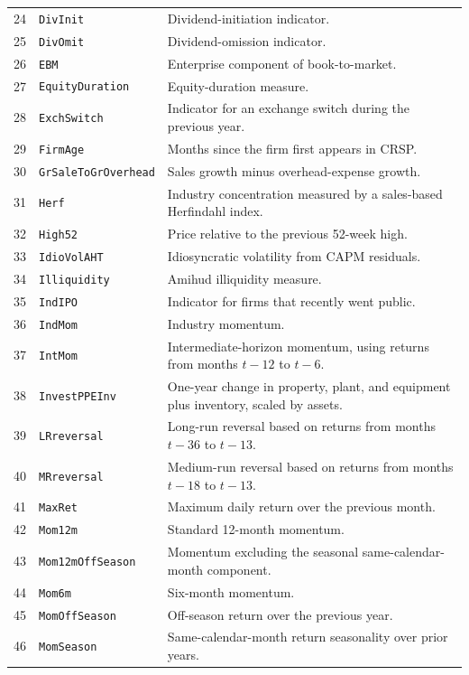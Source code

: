 \documentclass[11pt,letterpaper]{article}
\begin{document}
{\begin{longtable}{@{} r p{} p{} @{}}
  24 & \texttt{DivInit} & Dividend-initiation indicator. \\
  25 & \texttt{DivOmit} & Dividend-omission indicator. \\
  26 & \texttt{EBM} & Enterprise component of book-to-market. \\
  27 & \texttt{EquityDuration} & Equity-duration measure. \\
  28 & \texttt{ExchSwitch} & Indicator for an exchange switch during the previous year. \\
  29 & \texttt{FirmAge} & Months since the firm first appears in CRSP. \\
  30 & \texttt{GrSaleToGrOverhead} & Sales growth minus overhead-expense growth. \\
  31 & \texttt{Herf} & Industry concentration measured by a sales-based Herfindahl index. \\
  32 & \texttt{High52} & Price relative to the previous 52-week high. \\
  33 & \texttt{IdioVolAHT} & Idiosyncratic volatility from CAPM residuals. \\
  34 & \texttt{Illiquidity} & Amihud illiquidity measure. \\
  35 & \texttt{IndIPO} & Indicator for firms that recently went public. \\
  36 & \texttt{IndMom} & Industry momentum. \\
  37 & \texttt{IntMom} & Intermediate-horizon momentum, using returns from months $t-12$ to $t-6$. \\
  38 & \texttt{InvestPPEInv} & One-year change in property, plant, and equipment plus inventory, scaled by assets. \\
  39 & \texttt{LRreversal} & Long-run reversal based on returns from months $t-36$ to $t-13$. \\
  40 & \texttt{MRreversal} & Medium-run reversal based on returns from months $t-18$ to $t-13$. \\
  41 & \texttt{MaxRet} & Maximum daily return over the previous month. \\
  42 & \texttt{Mom12m} & Standard 12-month momentum. \\
  43 & \texttt{Mom12mOffSeason} & Momentum excluding the seasonal same-calendar-month component. \\
  44 & \texttt{Mom6m} & Six-month momentum. \\
  45 & \texttt{MomOffSeason} & Off-season return over the previous year. \\
  46 & \texttt{MomSeason} & Same-calendar-month return seasonality over prior years. \\

\end{longtable}}
\end{document}
